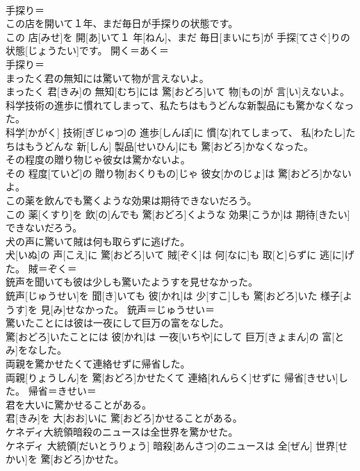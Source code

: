 \documentclass[8pt]{extreport}
\begin{document}
\begin{CJK}{UTF8}{min}
\\	手探り＝ 
\\	この店を開いて１年、まだ毎日が手探りの状態です。	
\\	この 店[みせ]を 開[あ]いて１ 年[ねん]、まだ 毎日[まいにち]が 手探[てさぐ]りの 状態[じょうたい]です。	開く＝あく＝ 
\\	手探り＝ 
\\	まったく君の無知には驚いて物が言えないよ。	
\\	まったく 君[きみ]の 無知[むち]には 驚[おどろ]いて 物[もの]が 言[い]えないよ。	
\\	科学技術の進歩に慣れてしまって、私たちはもうどんな新製品にも驚かなくなった。	
\\	科学[かがく] 技術[ぎじゅつ]の 進歩[しんぽ]に 慣[な]れてしまって、 私[わたし]たちはもうどんな 新[しん] 製品[せいひん]にも 驚[おどろ]かなくなった。	
\\	その程度の贈り物じゃ彼女は驚かないよ。	
\\	その 程度[ていど]の 贈り物[おくりもの]じゃ 彼女[かのじょ]は 驚[おどろ]かないよ。	
\\	この薬を飲んでも驚くような効果は期待できないだろう。	
\\	この 薬[くすり]を 飲[の]んでも 驚[おどろ]くような 効果[こうか]は 期待[きたい]できないだろう。	
\\	犬の声に驚いて賊は何も取らずに逃げた。	
\\	犬[いぬ]の 声[こえ]に 驚[おどろ]いて 賊[ぞく]は 何[なに]も 取[と]らずに 逃[に]げた。	賊＝ぞく＝ 
\\	銃声を聞いても彼は少しも驚いたようすを見せなかった。	
\\	銃声[じゅうせい]を 聞[き]いても 彼[かれ]は 少[すこ]しも 驚[おどろ]いた 様子[ようす]を 見[み]せなかった。	銃声＝じゅうせい＝ 
\\	驚いたことには彼は一夜にして巨万の富をなした。	
\\	驚[おどろ]いたことには 彼[かれ]は 一夜[いちや]にして 巨万[きょまん]の 富[とみ]をなした。	
\\	両親を驚かせたくて連絡せずに帰省した。	
\\	両親[りょうしん]を 驚[おどろ]かせたくて 連絡[れんらく]せずに 帰省[きせい]した。	帰省＝きせい＝ 
\\	君を大いに驚かせることがある。	
\\	君[きみ]を 大[おお]いに 驚[おどろ]かせることがある。	
\\	ケネディ大統領暗殺のニュースは全世界を驚かせた。	
\\	ケネディ 大統領[だいとうりょう] 暗殺[あんさつ]のニュースは 全[ぜん] 世界[せかい]を 驚[おどろ]かせた。	

\end{CJK}
\end{document}
